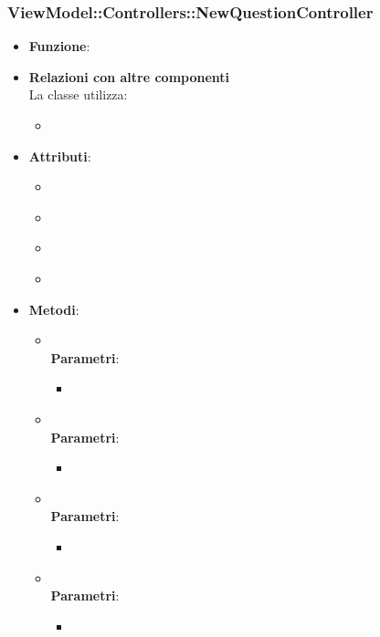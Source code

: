 \subsubsection{ViewModel::Controllers::NewQuestionController}
\begin{itemize}
\item\textbf{Funzione}:
\item\textbf{Relazioni con altre componenti}\\
La classe utilizza:
	\begin{itemize}
		\item
	\end{itemize}
\item\textbf{Attributi}:
	\begin{itemize}
		\item\code{}\\
		\item\code{}\\
		\item\code{}\\
		\item\code{}\\
	\end{itemize}
\item\textbf{Metodi}:
	\begin{itemize}
		\item\code{}\\
		\textbf{Parametri}:
			\begin{itemize}
				\item\code{}\\
			\end{itemize}
		\item\code{}\\
		\textbf{Parametri}:
			\begin{itemize}
				\item\code{}\\
			\end{itemize}
		\item\code{}\\
		\textbf{Parametri}:
			\begin{itemize}
				\item\code{}\\
			\end{itemize}
		\item\code{}\\
		\textbf{Parametri}:
			\begin{itemize}
				\item\code{}\\
			\end{itemize}
	\end{itemize}
\end{itemize}

